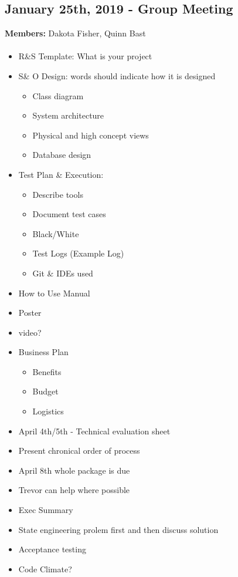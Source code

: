 \documentclass[12pt]{article}
\begin{document}
\subsection{January 25th, 2019 - Group Meeting}
\textbf{Members:} Dakota Fisher, Quinn Bast
\paragraph{} 
\begin{itemize}
	\item R\&S Template: What is your project
	\item S\& O Design: words should indicate how it is designed
	\begin{itemize}
		\item Class diagram
		\item System architecture
		\item Physical and high concept views
		\item Database design
	\end{itemize}
	\item Test Plan \& Execution:
	\begin{itemize}
		\item Describe tools
		\item Document test cases
		\item Black/White
		\item Test Logs (Example Log)
		\item Git \& IDEs used
	\end{itemize}
	\item How to Use Manual
	\item Poster
	\item video?
	\item Business Plan
	\begin{itemize}
		\item Benefits
		\item Budget
		\item Logistics
	\end{itemize}
	\item April 4th/5th - Technical evaluation sheet
	\item Present chronical order of process
	\item April 8th whole package is due
	\item Trevor can help where possible
	\item Exec Summary
	\item State engineering prolem first and then discuss solution
	\item Acceptance testing
	\item Code Climate?
\end{itemize}
\end{document}
